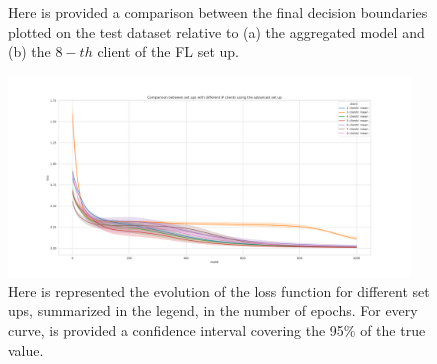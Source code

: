 \documentclass{article} %
\begin{document}
\begin{figure}[!hb]
    \centering
    \caption{Here is provided a comparison between the final decision boundaries plotted on 
        the test dataset relative to (a) the aggregated model and (b) the $8-th$ client of 
        the FL set up.}
    \label{fig5}
\end{figure}
\newpage
\begin{figure}[!ht]
    \centering
        \includegraphics[width=0.95\textwidth, keepaspectratio]{images/loss_red_adv.png}
    \caption{Here is represented the evolution of the loss function for different set ups, 
        summarized in the legend, in the number of epochs. For every curve, is provided a confidence 
        interval covering the 95\% of the true value.}
    \label{fig6}
\end{figure}
\end{document}
